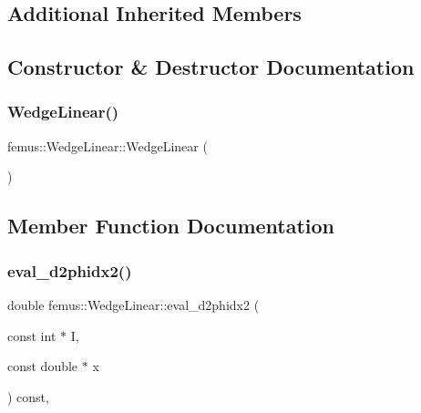 \subsection*{Additional Inherited Members}


\subsection{Constructor \& Destructor Documentation}
\mbox{\label{classfemus_1_1_wedge_linear_a7d7da7ba7e371b2d4179fba542dee171}} 
\subsubsection{\texorpdfstring{Wedge\+Linear()}{WedgeLinear()}}
{\footnotesize\ttfamily femus\+::\+Wedge\+Linear\+::\+Wedge\+Linear (\begin{DoxyParamCaption}{ }\end{DoxyParamCaption})\hspace{0.3cm}{\ttfamily [inline]}}



\subsection{Member Function Documentation}
\mbox{\label{classfemus_1_1_wedge_linear_a3d9966a1518937773d444bc5c449ce35}} 
\subsubsection{\texorpdfstring{eval\+\_\+d2phidx2()}{eval\_d2phidx2()}}
{\footnotesize\ttfamily double femus\+::\+Wedge\+Linear\+::eval\+\_\+d2phidx2 (\begin{DoxyParamCaption}\item[{const int $\ast$}]{I,  }\item[{const double $\ast$}]{x }\end{DoxyParamCaption}) const\hspace{0.3cm}{\ttfamily [inline]}, {\ttfamily [virtual]}}



